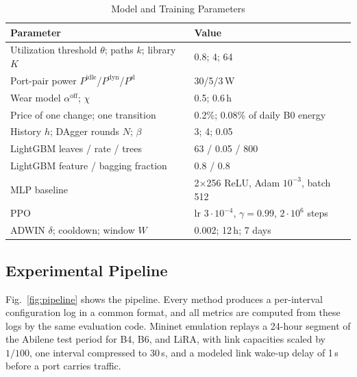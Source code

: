 \documentclass[journal]{IEEEtran}
\begin{document}
\begin{table}[t]
\centering
\caption{Model and Training Parameters}
\label{tab:params}
\footnotesize
\setlength{\tabcolsep}{3pt}
\begin{tabular}{@{}p{4.75cm}p{3.75cm}@{}}
\toprule
Parameter & Value \\
\midrule
Utilization threshold $\theta$; paths $k$; library $K$ & 0.8; 4; 64 \\
Port-pair power $P^{\mathrm{idle}}$/$P^{\mathrm{dyn}}$/$P^{\mathrm{sl}}$ & 30/5/3\,W \\
Wear model $\alpha^{\mathrm{off}}$; $\chi$ & 0.5; 0.6\,h \\
Price of one change; one transition & 0.2\%; 0.08\% of daily B0 energy \\
History $h$; DAgger rounds $N$; $\beta$ & 3; 4; 0.05 \\
LightGBM leaves / rate / trees & 63 / 0.05 / 800 \\
LightGBM feature / bagging fraction & 0.8 / 0.8 \\
MLP baseline & 2$\times$256 ReLU, Adam $10^{-3}$, batch 512 \\
PPO & lr $3\cdot10^{-4}$, $\gamma=0.99$, $2\cdot10^{6}$ steps \\
ADWIN $\delta$; cooldown; window $W$ & 0.002; 12\,h; 7 days \\
\bottomrule
\end{tabular}
\end{table}

\subsection{Experimental Pipeline}

Fig.~\ref{fig:pipeline} shows the pipeline. Every method produces a per-interval configuration log in a common format, and all metrics are computed from these logs by the same evaluation code. Mininet emulation replays a 24-hour segment of the Abilene test period for B4, B6, and LiRA, with link capacities scaled by $1/100$, one interval compressed to 30\,s, and a modeled link wake-up delay of 1\,s before a port carries traffic.
\end{document}
